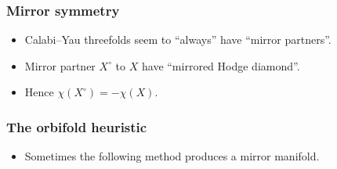 \documentclass[UKenglish]{beamer}
\begin{document}
\begin{frame}
\frametitle{Mirror symmetry}

\begin{itemize}
	\item Calabi--Yau threefolds seem to ``always'' have ``mirror partners''.
	\item Mirror partner $X^\circ$ to $X$ have ``mirrored Hodge diamond''.
	\item Hence $\chi(X^\circ)= - \chi(X)$.
\end{itemize}

\end{frame}

\begin{frame}
\frametitle{The orbifold heuristic}

\begin{itemize}
	\item Sometimes the following method produces a mirror manifold.
\end{itemize}


\end{frame}
\end{document}
